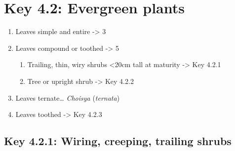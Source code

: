 \documentclass[openany]{book}
\providecommand{\tightlist}{%
  \setlength{\itemsep}{0pt}\setlength{\parskip}{0pt}}
\begin{document}
\hypertarget{key-4.2-evergreen-plants}{%
\section{Key 4.2: Evergreen plants}\label{key-4.2-evergreen-plants}}

\begin{enumerate}
\def\labelenumi{\arabic{enumi}.}
\tightlist
\item
  Leaves simple and entire -\textgreater{} 3
\item
  Leaves compound or toothed -\textgreater{} 5

  \begin{enumerate}
  \def\labelenumii{\arabic{enumii}.}
  \setcounter{enumii}{2}
  \tightlist
  \item
    Trailing, thin, wiry shrubs \textless{}20cm tall at maturity
    -\textgreater{} Key 4.2.1
  \item
    Tree or upright shrub -\textgreater{} Key 4.2.2
  \end{enumerate}
\item
  Leaves ternate\ldots{} \emph{Choisya} (\emph{ternata})
\item
  Leaves toothed -\textgreater{} Key 4.2.3
\end{enumerate}

\hypertarget{key-4.2.1-wiring-creeping-trailing-shrubs}{%
\subsection{Key 4.2.1: Wiring, creeping, trailing
shrubs}\label{key-4.2.1-wiring-creeping-trailing-shrubs}}
\end{document}
